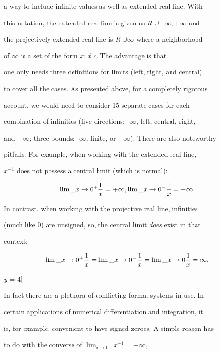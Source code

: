 a way to include infinite values as well as extended real line. With

this notation, the extended real line is given as \textit{R} $\cup {-\infty, +\infty}$ and

the projectively extended real line is \textit{R} $\cup {\infty}$ where a neighborhood

of $\infty$ is a set of the form {\textit{x}: \|\textit{x}\| \> \textit{c}}. The advantage is that

one only needs three definitions for limits (left, right, and central)

to cover all the cases. As presented above, for a completely rigorous

account, we would need to consider 15 separate cases for each

combination of infinities (five directions: -$\infty$, left, central, right,

and +$\infty$; three bounds: -$\infty$, finite, or +$\infty$). There are also noteworthy

pitfalls. For example, when working with the extended real line,

$x^{-1}$ does not possess a central limit (which is normal):



$$\lim\_{x \to 0^{+}}{1\over x} = +\infty, \lim\_{x \to 0^{-}}{1\over x} = -\infty.$$



In contrast, when working with the projective real line, infinities

(much like 0) are unsigned, so, the central limit \textit{does} exist in that

context:



$$\lim\_{x \to 0^{+}}{1\over x} = \lim\_{x \to 0^{-}}{1\over x} = \lim\_{x \to 0}{1\over x} = \infty.$$






\textit{y} = 4]



In fact there are a plethora of conflicting formal systems in use. In

certain applications of numerical differentiation and integration, it

is, for example, convenient to have signed zeroes. A simple reason has

to do with the converse of $\lim_{x \to 0^{-}}{x^{-1}} = -\infty$,

